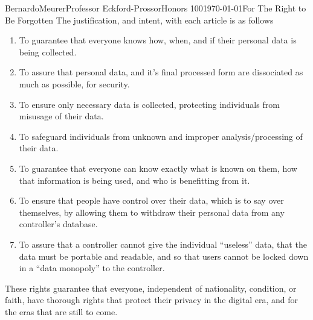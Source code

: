 \documentclass[12pt,letterpaper]{article}
\begin{document}
\begin{mla}{Bernardo}{Meurer}{Professor Eckford-Prossor}{Honors 100}{\today}{For The Right to Be Forgotten}
The justification, and intent, with each article is as follows 
\begin{enumerate}
    \item To guarantee that everyone knows how, when, and if their personal data is being collected.
    \item To assure that personal data, and it's final processed form are dissociated as much as possible, for security.
    \item To ensure only necessary data is collected, protecting individuals from misusage of their data.
    \item To safeguard individuals from unknown and improper analysis/processing of their data.
    \item To guarantee that everyone can know exactly what is known on them, how that information is being used, and who is benefitting from it.
    \item To ensure that people have control over their data, which is to say over themselves, by allowing them to withdraw their personal data from any controller's database.
    \item To assure that a controller cannot give the individual ``useless'' data, that the data must be portable and readable, and so that users cannot be locked down in a ``data monopoly'' to the controller.
\end{enumerate}

These rights guarantee that everyone, independent of nationality, condition, or faith, have thorough rights that protect their privacy in the digital era, and for the eras that are still to come.
\end{mla}
\end{document}
